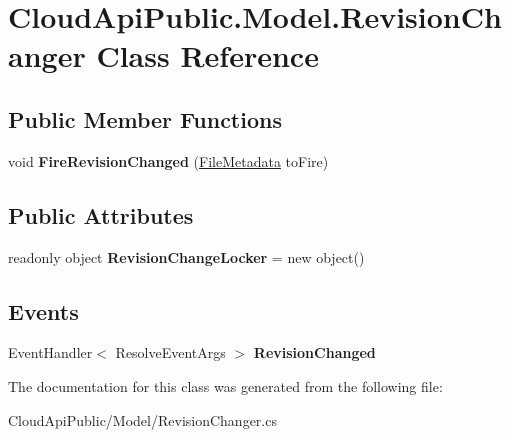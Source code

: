 \hypertarget{class_cloud_api_public_1_1_model_1_1_revision_changer}{\section{Cloud\-Api\-Public.\-Model.\-Revision\-Changer Class Reference}
\label{class_cloud_api_public_1_1_model_1_1_revision_changer}
}
\subsection*{Public Member Functions}
\begin{DoxyCompactItemize}
\item 
\hypertarget{class_cloud_api_public_1_1_model_1_1_revision_changer_a1aa42079a10cb0f1bc9390bf6ba8d33f}{void {\bfseries Fire\-Revision\-Changed} (\hyperlink{class_cloud_api_public_1_1_model_1_1_file_metadata}{File\-Metadata} to\-Fire)}\label{class_cloud_api_public_1_1_model_1_1_revision_changer_a1aa42079a10cb0f1bc9390bf6ba8d33f}

\end{DoxyCompactItemize}
\subsection*{Public Attributes}
\begin{DoxyCompactItemize}
\item 
\hypertarget{class_cloud_api_public_1_1_model_1_1_revision_changer_a659e67212c2d52a5791010a612dddfdb}{readonly object {\bfseries Revision\-Change\-Locker} = new object()}\label{class_cloud_api_public_1_1_model_1_1_revision_changer_a659e67212c2d52a5791010a612dddfdb}

\end{DoxyCompactItemize}
\subsection*{Events}
\begin{DoxyCompactItemize}
\item 
\hypertarget{class_cloud_api_public_1_1_model_1_1_revision_changer_a4df1b0c17e12bfbb07ee42913b9eb560}{Event\-Handler$<$ Resolve\-Event\-Args $>$ {\bfseries Revision\-Changed}}\label{class_cloud_api_public_1_1_model_1_1_revision_changer_a4df1b0c17e12bfbb07ee42913b9eb560}

\end{DoxyCompactItemize}


The documentation for this class was generated from the following file\-:\begin{DoxyCompactItemize}
\item 
Cloud\-Api\-Public/\-Model/Revision\-Changer.\-cs\end{DoxyCompactItemize}
